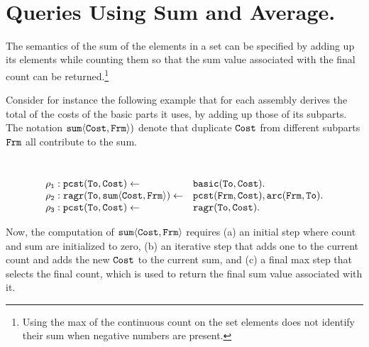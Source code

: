 \documentclass[11pt]{article}
\def\mt{\tt}
\newcommand{\cldl}{\[\begin{array}{ll}}
\newcommand{\eldl}{\end{array}\]\rm}
\newcommand{\prule}[2]{ \mt #1 \leftarrow & \mt #2 \\}
\def\inv{\vspace{-0.2cm}}
\def\sinv{\vspace{-0.1cm}}
\def\inv{\vspace{-0.2cm}}
\def\sinv{\vspace{-0.1cm}}
\begin{document}
~\\[-1.8cm]

\section{{\large Queries Using Sum and Average.}}
\sinv  
The semantics of the sum of the elements in a set can be specified by 
adding up its elements while counting them so that  the sum value
associated with the final count can be returned.\footnote{Using the max of the continuous count
on the set elements does not identify their sum when negative numbers are present.}


Consider for instance the following example that for each assembly derives the total of the costs of the basic
parts it uses, by adding up those of its subparts. The notation $\tt sum\langle  Cost, Frm \rangle)$ denote that
duplicate  $\tt Cost$ from different subparts $\tt Frm$ all contribute to the sum.\\[-0.4cm]
\begin{example} 
 \label{ex:cost}
 
 ~\\[-0.2cm]
\cldl
 \prule {\rho_1: pcst(To, Cost)}{basic(To, Cost).}
 \prule{\rho_2:  ragr(To, sum\langle  Cost, Frm \rangle)}
{pcst(Frm, Cost),  arc(Frm, To).}
 \prule{\rho_3:  pcst(To, Cost)} {ragr(To, Cost).}
 \eldl
\end{example}
Now,  the computation of $\tt sum\langle  Cost, Frm \rangle$  requires (a) an initial step where
count and sum are initialized to zero, (b) an iterative step that adds one to the current count and adds
the new $\tt Cost$ to the current sum, and (c) a final max step that selects the final count, which 
is used to return the final sum value associated with it.


\end{document}
